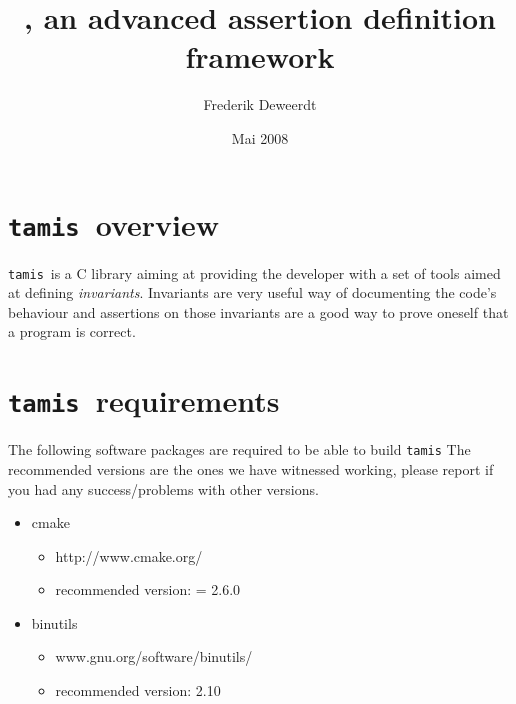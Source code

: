 \documentclass[a4paper,11pt]{article}
\title{\T, an advanced assertion definition framework}
\author{Frederik Deweerdt}
\date{Mai 2008}
\def \T {{\tt tamis}}
\begin{document}
\maketitle

\section{\T\ overview}
\T\ is a C library aiming at providing the developer with a set of tools aimed
at defining {\it invariants}. Invariants are very useful way of documenting
the code's behaviour and assertions on those invariants are a good way to
prove oneself that a program is correct.

\section{\T\ requirements}
The following software packages are required to be able to build \T
The recommended versions are the ones we have witnessed working, please
report if you had any success/problems with other versions.
\begin{itemize}
\item{
	cmake
	\begin{itemize}
		\item{http://www.cmake.org/}
		\item{recommended version: = 2.6.0}
	\end{itemize}
}

\item{
	binutils
	\begin{itemize}
		\item{www.gnu.org/software/binutils/}
		\item{recommended version: 2.10}
	\end{itemize}
}

\end{itemize}
\end{document}
